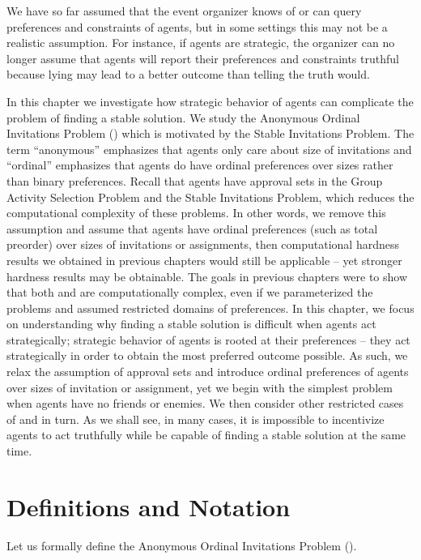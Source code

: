 \label{GT:chapter}


We have so far assumed that the event organizer knows of or can query preferences and constraints of agents, but in some settings this may not be a realistic assumption. For instance, if agents are strategic, the organizer can no longer assume that agents will report their preferences and constraints truthful because lying may lead to a better outcome than telling the truth would.

In this chapter we investigate how strategic behavior of agents can complicate the problem of finding a stable solution.
We study the Anonymous Ordinal Invitations Problem (\AOIP) which is motivated by the Stable Invitations Problem. The term ``anonymous'' emphasizes that agents only care about size of invitations and ``ordinal'' emphasizes that agents do have ordinal preferences over sizes rather than binary preferences. Recall that agents have approval sets in the Group Activity Selection Problem and the Stable Invitations Problem, which reduces the computational complexity of these problems. In other words, we remove this assumption and assume that agents have ordinal preferences (such as total preorder) over sizes of invitations or assignments, then computational hardness results we obtained in previous chapters would still be applicable -- yet stronger hardness results may be obtainable. The goals in previous chapters were to show that both \GASPs and \SIPs are computationally complex, even if we parameterized the problems and assumed restricted domains of preferences. In this chapter, we focus on understanding why finding a stable solution is difficult when agents act strategically; strategic behavior of agents is rooted at their preferences -- they act strategically in order to obtain the most preferred outcome possible. As such, we relax the assumption of approval sets and introduce ordinal preferences of agents over sizes of invitation or assignment, yet we begin with the simplest problem when agents have no friends or enemies. We then consider other restricted cases of \GASPs and \SIPs in turn. As we shall see, in many cases, it is impossible to incentivize agents to act truthfully while be capable of finding a stable solution at the same time.


\section{Definitions and Notation} \label{GT:sec:prelim}

Let us formally define the Anonymous Ordinal Invitations Problem (\AOIP).

